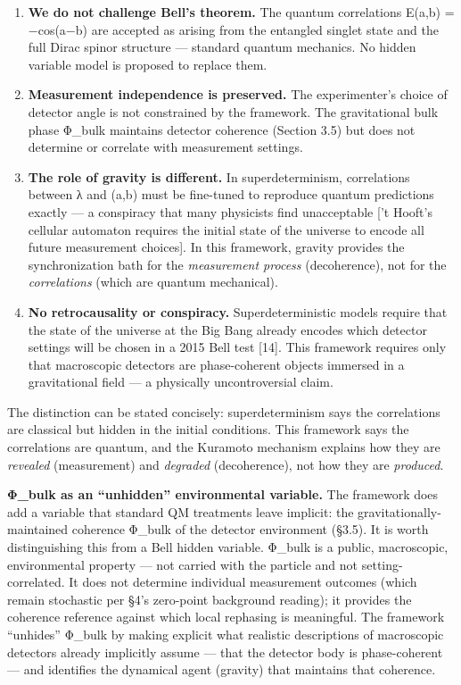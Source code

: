 \documentclass[
]{article}
\begin{document}
\begin{enumerate}
\def\labelenumi{\arabic{enumi}.}
\item
  \textbf{We do not challenge Bell's theorem.} The quantum correlations
  E(a,b) = −cos(a−b) are accepted as arising from the entangled singlet
  state and the full Dirac spinor structure --- standard quantum
  mechanics. No hidden variable model is proposed to replace them.
\item
  \textbf{Measurement independence is preserved.} The experimenter's
  choice of detector angle is not constrained by the framework. The
  gravitational bulk phase Φ\_bulk maintains detector coherence (Section
  3.5) but does not determine or correlate with measurement settings.
\item
  \textbf{The role of gravity is different.} In superdeterminism,
  correlations between λ and (a,b) must be fine-tuned to reproduce
  quantum predictions exactly --- a conspiracy that many physicists find
  unacceptable {[}'t Hooft's cellular automaton requires the initial
  state of the universe to encode all future measurement choices{]}. In
  this framework, gravity provides the synchronization bath for the
  \emph{measurement process} (decoherence), not for the
  \emph{correlations} (which are quantum mechanical).
\item
  \textbf{No retrocausality or conspiracy.} Superdeterministic models
  require that the state of the universe at the Big Bang already encodes
  which detector settings will be chosen in a 2015 Bell test {[}14{]}.
  This framework requires only that macroscopic detectors are
  phase-coherent objects immersed in a gravitational field --- a
  physically uncontroversial claim.
\end{enumerate}

The distinction can be stated concisely: superdeterminism says the
correlations are classical but hidden in the initial conditions. This
framework says the correlations are quantum, and the Kuramoto mechanism
explains how they are \emph{revealed} (measurement) and \emph{degraded}
(decoherence), not how they are \emph{produced}.

\textbf{Φ\_bulk as an ``unhidden'' environmental variable.} The
framework does add a variable that standard QM treatments leave
implicit: the gravitationally- maintained coherence Φ\_bulk of the
detector environment (§3.5). It is worth distinguishing this from a Bell
hidden variable. Φ\_bulk is a public, macroscopic, environmental
property --- not carried with the particle and not setting-correlated.
It does not determine individual measurement outcomes (which remain
stochastic per §4's zero-point background reading); it provides the
coherence reference against which local rephasing is meaningful. The
framework ``unhides'' Φ\_bulk by making explicit what realistic
descriptions of macroscopic detectors already implicitly assume --- that
the detector body is phase-coherent --- and identifies the dynamical
agent (gravity) that maintains that coherence.
\end{document}
